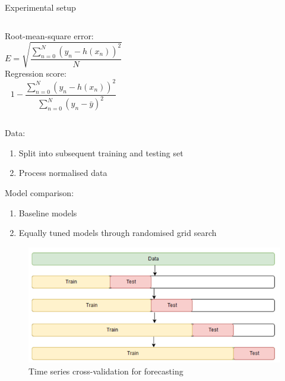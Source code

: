 \documentclass[9.5pt]{beamer}
\begin{document}
    \begin{frame}{Experimental setup}
        \begin{columns}[onlytextwidth]
            \centering
            Root-mean-square error:
            \[E = \sqrt{\dfrac{\sum_{n=0}^N (y_n - h(x_n))^2}{N}}\]
            \centering
            Regression score:
            \[1-\dfrac{\sum_{n=0}^N (y_n - h(x_n))^2}{\sum_{n=0}^N (y_n - \bar{y})^2}\]
        \end{columns}

        Data:
        \begin{enumerate}
            \item Split into subsequent training and testing set
            \item Process normalised data
        \end{enumerate}

        Model comparison:
        \begin{enumerate}
            \item Baseline models
            \item Equally tuned models through randomised grid search
        \end{enumerate}

    \end{frame}

    \begin{frame}{}
        \begin{figure}
            \centering
            \includegraphics[width=\linewidth]{images/validation}
            \caption{Time series cross-validation for forecasting}
        \end{figure}
    \end{frame}
\end{document}
